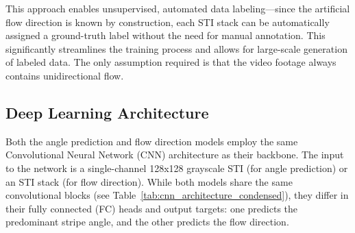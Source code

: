 \documentclass[12pt]{elsarticle}
\begin{document}
This approach enables unsupervised, automated data labeling—since the artificial flow direction is known by construction, each STI stack can be automatically assigned a ground-truth label without the need for manual annotation. This significantly streamlines the training process and allows for large-scale generation of labeled data. The only assumption required is that the video footage always contains unidirectional flow.
\subsection{Deep Learning Architecture}
Both the angle prediction and flow direction models employ the same Convolutional Neural Network (CNN) architecture as their backbone. The input to the network is a single-channel 128x128 grayscale STI (for angle prediction) or an STI stack (for flow direction). While both models share the same convolutional blocks (see Table~\ref{tab:cnn_architecture_condensed}), they differ in their fully connected (FC) heads and output targets: one predicts the predominant stripe angle, and the other predicts the flow direction.
\end{document}
